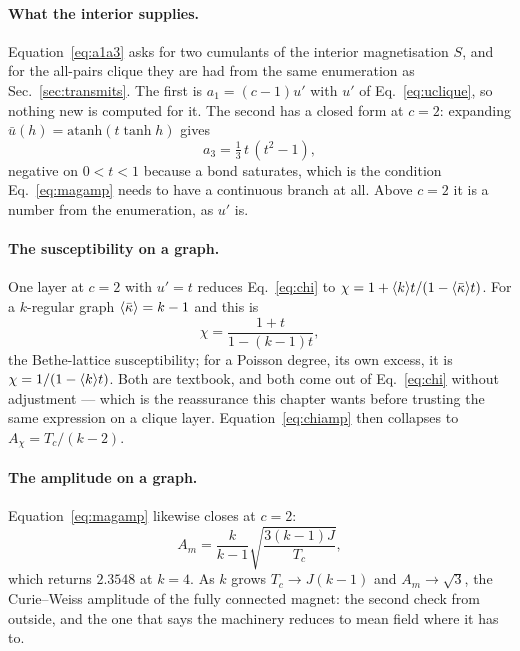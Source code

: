 \paragraph{What the interior supplies.} Equation~\eqref{eq:a1a3} asks for two
cumulants of the interior magnetisation $S$, and for the all-pairs clique they
are had from the same enumeration as Sec.~\ref{sec:transmits}. The first is
$a_{1}=(c-1)u'$ with $u'$ of Eq.~\eqref{eq:uclique}, so nothing new is computed
for it. The second has a closed form at $c=2$: expanding
$\bar u(h)=\mathrm{atanh}(t\tanh h)$ gives
\begin{equation}
  a_{3}=\tfrac{1}{3}\,t\,(t^{2}-1),
  \label{eq:a3edge}
\end{equation}
negative on $0<t<1$ because a bond saturates, which is the condition
Eq.~\eqref{eq:magamp} needs to have a continuous branch at all. Above $c=2$ it
is a number from the enumeration, as $u'$ is.

\paragraph{The susceptibility on a graph.} One layer at $c=2$ with $u'=t$
reduces Eq.~\eqref{eq:chi} to $\chi=1+\langle k \rangle t/(1-\langle \bar\kappa \rangle t)$. For a
$k$-regular graph $\langle \bar\kappa \rangle=k-1$ and this is
\begin{equation}
  \chi=\frac{1+t}{1-(k-1)t},
  \label{eq:chibethe}
\end{equation}
the Bethe-lattice susceptibility; for a Poisson degree, its own excess, it is
$\chi=1/(1-\langle k \rangle t)$. Both are textbook, and both come out of
Eq.~\eqref{eq:chi} without adjustment --- which is the reassurance this chapter
wants before trusting the same expression on a clique layer.
Equation~\eqref{eq:chiamp} then collapses to $A_{\chi}=T_{c}/(k-2)$.

\paragraph{The amplitude on a graph.} Equation~\eqref{eq:magamp} likewise
closes at $c=2$:
\begin{equation}
  A_{m}=\frac{k}{k-1}\sqrt{\frac{3(k-1)J}{T_{c}}},
  \label{eq:magampgraph}
\end{equation}
which returns $2.3548$ at $k=4$. As $k$ grows $T_{c}\to J(k-1)$ and
$A_{m}\to\sqrt3$, the Curie--Weiss amplitude of the fully connected magnet: the
second check from outside, and the one that says the machinery reduces to mean
field where it has to.

